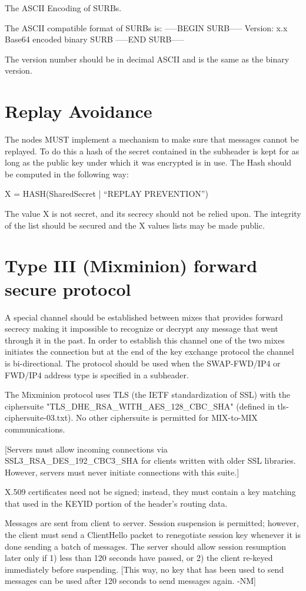 The ASCII Encoding of SURBs.

The  ASCII compatible format of SURBs is:
-----BEGIN SURB-----
Version: x.x
Base64 encoded binary SURB 
-----END SURB-----

The version number should be in decimal ASCII and is the same as the
binary version.

\section{Replay Avoidance}

The nodes MUST implement a mechanism to make sure that messages cannot
be replayed. To do this a hash of the secret contained in the
subheader is kept for as long as the public key under which it was
encrypted is in use. The Hash should be computed in the following way:

X = HASH(SharedSecret | ``REPLAY PREVENTION'')

The value X is not secret, and its secrecy should not be relied upon.
The integrity of the list should be secured and the X values lists may
be made public.

\section{Type III (Mixminion) forward secure protocol}

A special channel should be established between mixes that provides
forward secrecy making it impossible to recognize or decrypt any
message that went through it in the past. In order to establish this
channel one of the two mixes initiates the connection but at the end
of the key exchange protocol the channel is bi-directional. The
protocol should be used when the SWAP-FWD/IP4 or FWD/IP4 address type
is specified in a subheader.

The Mixminion protocol uses TLS (the IETF standardization of SSL) with
the ciphersuite "TLS_DHE_RSA_WITH_AES_128_CBC_SHA" (defined in
tls-ciphersuite-03.txt).  No other ciphersuite is permitted for
MIX-to-MIX communications.

[Servers must allow incoming connections via SSL3_RSA_DES_192_CBC3_SHA
for clients written with older SSL libraries.  However, servers must
never initiate connections with this suite.]

X.509 certificates need not be signed; instead, they must contain
a key matching that used in the KEYID portion of the header's routing
data.  

Messages are sent from client to server.  Session suspension is
permitted; however, the client must send a ClientHello packet to
renegotiate session key whenever it is done sending a batch of
messages.  The server should allow session resumption later only if 1)
less than 120 seconds have passed, or 2) the client re-keyed
immediately before suspending.  [This way, no key that has been used
to send messages can be used after 120 seconds to send messages
again. -NM]

